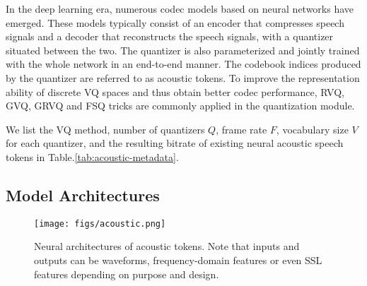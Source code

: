 In the deep learning era, numerous codec models based on neural networks have emerged.
These models typically consist of an encoder that compresses speech signals and a decoder that reconstructs the speech signals, with a quantizer situated between the two.
The quantizer is also parameterized and jointly trained with the whole network in an end-to-end manner. 
The codebook indices produced by the quantizer are referred to as acoustic tokens.
To improve the representation ability of discrete VQ spaces and thus obtain better codec performance, RVQ, GVQ, GRVQ and FSQ tricks are commonly applied in the quantization module.

We list the VQ method, number of quantizers $Q$, frame rate $F$, vocabulary size $V$ for each quantizer, and the resulting bitrate of existing neural acoustic speech tokens in Table.\ref{tab:acoustic-metadata}.

\subsection{Model Architectures}
\label{sec:acoustic-arch}

\begin{figure}
    \centering
    \texttt{[image: figs/acoustic.png]}
    \caption{Neural architectures of acoustic tokens.
    Note that inputs and outputs can be waveforms, frequency-domain features or even SSL features depending on purpose and design.}
    \label{fig:acoustic-paradigms}
\end{figure}


